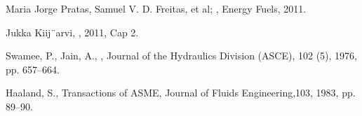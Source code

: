 \documentclass[12pt, a4paper]{article}
\begin{document}
    \begin{thebibliography}{9}
            Maria Jorge Pratas, Samuel V. D. Freitas, et al; 
            , Energy Fuels, 2011.

            Jukka Kiij¨arvi, , 2011, Cap 2.

            Swamee, P., Jain, A.,
            , Journal of the Hydraulics Division (ASCE), 102 (5), 1976, pp. 657–664.

            Haaland, S., 
             Transactions of ASME, Journal of Fluids Engineering,103, 1983, pp. 89–90.

    \end{thebibliography}
\end{document}
